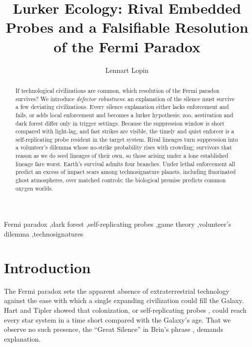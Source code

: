 \documentclass[preprint,12pt]{elsarticle}
\theoremstyle{definition}
\begin{document}
\begin{frontmatter}

\title{Lurker Ecology: Rival Embedded Probes and a Falsifiable Resolution of the Fermi Paradox}

\author[aff1]{Lennart Lopin}

\begin{abstract}
If technological civilizations are common, which resolution of the Fermi paradox survives? We introduce \emph{defector robustness}: an explanation of the silence must survive a few deviating civilizations. Every silence explanation either lacks enforcement and fails, or adds local enforcement and becomes a lurker hypothesis; zoo, aestivation and dark forest differ only in trigger settings. Because the suppression window is short compared with light-lag, and fast strikes are visible, the timely and quiet enforcer is a self-replicating probe resident in the target system. Rival lineages turn suppression into a volunteer's dilemma whose no-strike probability rises with crowding; survivors that reason as we do seed lineages of their own, so those arising under a lone established lineage fare worst. Earth's survival admits four branches. Under lethal enforcement all predict an excess of impact scars among technosignature planets, including fluorinated ghost atmospheres, over matched controls; the biological premise predicts common oxygen worlds.
\end{abstract}


\begin{keyword}
Fermi paradox \sep dark forest \sep self-replicating probes \sep game theory \sep volunteer's dilemma \sep technosignatures
\end{keyword}

\end{frontmatter}

\section{Introduction}
\label{sec:intro}

The Fermi paradox sets the apparent absence of extraterrestrial technology against the ease with which a single expanding civilization could fill the Galaxy. Hart \citep{Hart1975} and Tipler \citep{Tipler1980} showed that colonization, or self-replicating probes \citep{Freitas1980}, could reach every star system in a time short compared with the Galaxy's age. That we observe no such presence, the ``Great Silence'' in Brin's phrase \citep{Brin1983}, demands explanation.
\end{document}
